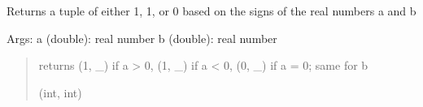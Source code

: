 \documentclass[letterpaper,10pt,english]{sphinxmanual}
\begin{document}
\begin{fulllineitems}
\label{\detokenize{analytical_reject:analytical_reject.signes}}
\pysigstartsignatures
\pysiglinewithargsret
{}
{\sphinxparamcomma {}}
{}
\pysigstopsignatures
\sphinxAtStartPar
Returns a tuple of either 1, \sphinxhyphen{}1, or 0 based on the signs of the real numbers a and b

\sphinxAtStartPar
Args:
a (double): real number
b (double): real number
\begin{quote}\begin{description}
\sphinxAtStartPar
returns (1, \_) if a \textgreater{} 0, (\sphinxhyphen{}1, \_) if a \textless{} 0, (0, \_) if a = 0; same for b

\sphinxAtStartPar
(int, int)

\end{description}\end{quote}

\end{fulllineitems}

\end{document}

